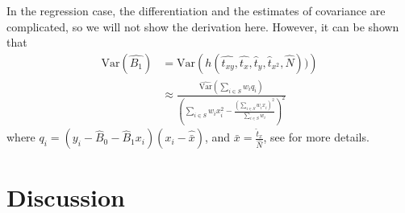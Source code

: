 \documentclass{article}
\begin{document}
In the regression case, the differentiation and the estimates of covariance
are complicated, so we will not show the derivation here. However, it can be shown that
\begin{align*}
 \mathrm{Var}(\hat{B_1})
 &= \mathrm{Var} \left( h(\hat{t_{xy}}, \hat{t_x},
 \hat{t}_y, \hat{t}_{x^2}, \hat{N})) \right) \\
 &\approx \frac{\widehat{\mathrm{Var}}\left( \sum_{i \in S} w_i q_i \right)}
   {\left( \sum_{i \in S} w_i x_i^2 - \frac{\left( \sum_{i \in S} w_i x_i \right)^2}{\sum_{i \in S} w_i} \right)^2}
\end{align*}
where \(q_i = (y_i - \hat{B}_0 - \hat{B}_1 x_i)(x_i - \hat{\bar{x}})\), and
\(\bar{x} = \frac{\hat{t}_x}{\hat{N}}\), see \cite[Chapter 11]{sampReg} for more
details.



\section{Discussion} \label{sec:discussion}


\end{document}
